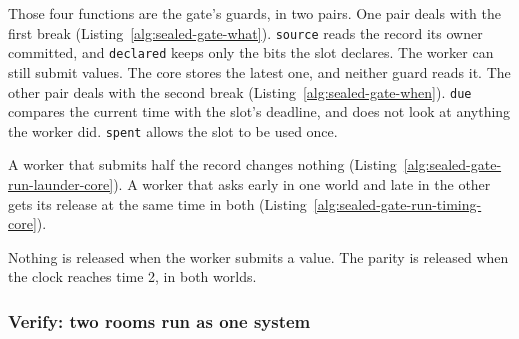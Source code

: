 
Those four functions are the gate's guards, in two pairs. One pair deals
with the first break (Listing~\ref{alg:sealed-gate-what}).
\texttt{source} reads the record its owner committed, and \texttt{declared}
keeps only the bits the slot declares. The worker can still submit values.
The core stores the latest one, and neither guard reads it. The other pair
deals with the second break (Listing~\ref{alg:sealed-gate-when}).
\texttt{due} compares the current time with the slot's deadline, and does
not look at anything the worker did. \texttt{spent} allows the slot to be
used once.



A worker that submits half the record changes nothing
(Listing~\ref{alg:sealed-gate-run-launder-core}). A worker that asks early
in one world and late in the other gets its release at the same time in
both (Listing~\ref{alg:sealed-gate-run-timing-core}).



Nothing is released when the worker submits a value. The parity is
released when the clock reaches time 2, in both worlds.


\subsubsection{Verify: two rooms run as one system}

